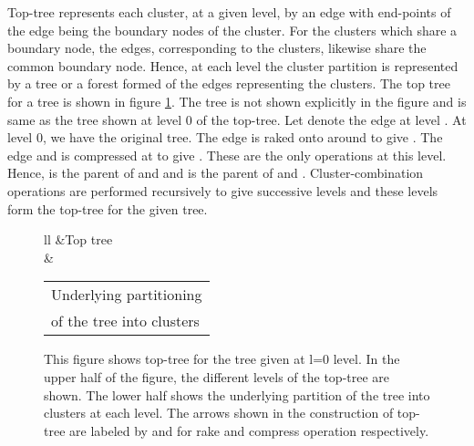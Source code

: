 \documentclass[a4paper,12pt]{article}
\begin{document}
Top-tree represents each cluster, at a given level, by an edge with end-points of the edge being the boundary nodes of the cluster. For the clusters which share a boundary node, the edges, corresponding to the clusters, likewise share the common boundary node. Hence, at each level the cluster partition is represented by a tree or a forest formed of the edges representing the clusters. The top tree for a tree is shown in figure \ref{top-tree-example}. The tree is not shown explicitly in the figure and is same as the tree shown at level 0 of the top-tree. Let  denote the edge at level . At level 0, we have the original tree. The edge  is raked onto  around  to give . The edge  and  is compressed at  to give . These are the only operations at this level. Hence,  is the parent of  and  and  is the parent of  and . Cluster-combination operations are performed recursively to give successive levels and these levels form the top-tree for the given tree. 

\begin{figure}
\begin{tabular}{ll}
&Top tree\\
&\begin{tabular}{l}Underlying partitioning\\of the tree into clusters\end{tabular}
\end{tabular}
\caption{This figure shows top-tree for the tree given at l=0 level. In the upper half of the figure, the different levels of the top-tree are shown. The lower half shows the underlying partition of the tree into clusters at each level. The arrows shown in the construction of top-tree are labeled by  and  for rake and compress operation respectively.}
\label{top-tree-example}
\end{figure}
\end{document}
